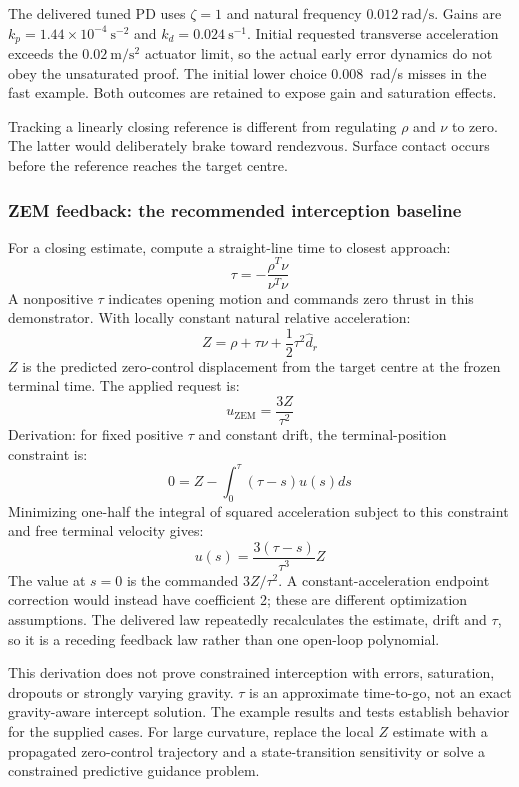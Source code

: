 \documentclass[11pt,a4paper]{article}
\begin{document}
The delivered tuned PD uses $\zeta = 1$ and natural frequency $0.012\mathrm{~rad/s}$. Gains are $k_p = 1.44 \times 10^{-4}\mathrm{~s^{-2}}$ and $k_d = 0.024\mathrm{~s^{-1}}$. Initial requested transverse acceleration exceeds the $0.02\mathrm{~m/s^2}$ actuator limit, so the actual early error dynamics do not obey the unsaturated proof. The initial lower choice 0.008~rad/s misses in the fast example. Both outcomes are retained to expose gain and saturation effects.

Tracking a linearly closing reference is different from regulating $\rho$ and $\nu$ to zero. The latter would deliberately brake toward rendezvous. Surface contact occurs before the reference reaches the target centre.

\subsubsection{ZEM feedback: the recommended interception baseline}
For a closing estimate, compute a straight-line time to closest approach:
\[ \tau = -\frac{\rho^{T} \nu}{\nu^{T} \nu} \]
A nonpositive $\tau$ indicates opening motion and commands zero thrust in this demonstrator. With locally constant natural relative acceleration:
\[ Z = \rho + \tau \nu + \frac{1}{2} \tau^{2} \hat{d}_{r} \]
$Z$ is the predicted zero-control displacement from the target centre at the frozen terminal time. The applied request is:
\[ u_{\mathrm{ZEM}} = \frac{3Z}{\tau^{2}} \]
Derivation: for fixed positive $\tau$ and constant drift, the terminal-position constraint is:
\[ 0 = Z - \int_{0}^{\tau} (\tau - s) u(s) ds \]
Minimizing one-half the integral of squared acceleration subject to this constraint and free terminal velocity gives:
\[ u(s) = \frac{3(\tau - s)}{\tau^{3}} Z \]
The value at $s=0$ is the commanded $3Z/\tau^{2}$. A constant-acceleration endpoint correction would instead have coefficient 2; these are different optimization assumptions. The delivered law repeatedly recalculates the estimate, drift and $\tau$, so it is a receding feedback law rather than one open-loop polynomial.

This derivation does not prove constrained interception with errors, saturation, dropouts or strongly varying gravity. $\tau$ is an approximate time-to-go, not an exact gravity-aware intercept solution. The example results and tests establish behavior for the supplied cases. For large curvature, replace the local $Z$ estimate with a propagated zero-control trajectory and a state-transition sensitivity or solve a constrained predictive guidance problem.
\end{document}
